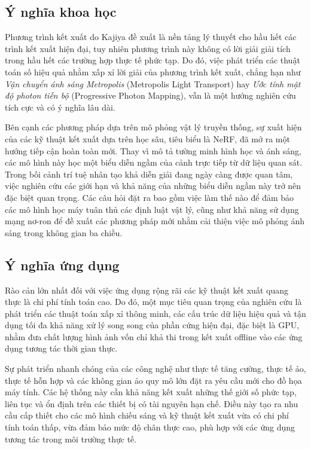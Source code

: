 \subsection{Ý nghĩa khoa học}

Phương trình kết xuất do Kajiya đề xuất là nền tảng lý thuyết cho hầu hết các trình kết xuất hiện đại, tuy nhiên phương trình này không có lời giải giải tích trong hầu hết các trường hợp thực tế phức tạp. Do đó, việc phát triển các thuật toán số hiệu quả nhằm xấp xỉ lời giải của phương trình kết xuất, chẳng hạn như \textit{Vận chuyển ánh sáng Metropolis} (Metropolis Light Transport) hay \textit{Ước tính mật độ photon tiến bộ} (Progressive Photon Mapping), vẫn là một hướng nghiên cứu tích cực và có ý nghĩa lâu dài.

Bên cạnh các phương pháp dựa trên mô phỏng vật lý truyền thống, sự xuất hiện của các kỹ thuật kết xuất dựa trên học sâu, tiêu biểu là NeRF, đã mở ra một hướng tiếp cận hoàn toàn mới. Thay vì mô tả tường minh hình học và ánh sáng, các mô hình này học một biểu diễn ngầm của cảnh trực tiếp từ dữ liệu quan sát. Trong bối cảnh trí tuệ nhân tạo khả diễn giải đang ngày càng được quan tâm, việc nghiên cứu các giới hạn và khả năng của những biểu diễn ngầm này trở nên đặc biệt quan trọng. Các câu hỏi đặt ra bao gồm việc làm thế nào để đảm bảo các mô hình học máy tuân thủ các định luật vật lý, cũng như khả năng sử dụng mạng nơ-ron để đề xuất các phương pháp mới nhằm cải thiện việc mô phỏng ánh sáng trong không gian ba chiều.

\subsection{Ý nghĩa ứng dụng}

Rào cản lớn nhất đối với việc ứng dụng rộng rãi các kỹ thuật kết xuất quang thực là chi phí tính toán cao. Do đó, một mục tiêu quan trọng của nghiên cứu là phát triển các thuật toán xấp xỉ thông minh, các cấu trúc dữ liệu hiệu quả và tận dụng tối đa khả năng xử lý song song của phần cứng hiện đại, đặc biệt là GPU, nhằm đưa chất lượng hình ảnh vốn chỉ khả thi trong kết xuất offline vào các ứng dụng tương tác thời gian thực.

Sự phát triển nhanh chóng của các công nghệ như thực tế tăng cường, thực tế ảo, thực tế hỗn hợp và các không gian ảo quy mô lớn đặt ra yêu cầu mới cho đồ họa máy tính. Các hệ thống này cần khả năng kết xuất những thế giới số phức tạp, liên tục và ổn định trên các thiết bị có tài nguyên hạn chế. Điều này tạo ra nhu cầu cấp thiết cho các mô hình chiếu sáng và kỹ thuật kết xuất vừa có chi phí tính toán thấp, vừa đảm bảo mức độ chân thực cao, phù hợp với các ứng dụng tương tác trong môi trường thực tế.

